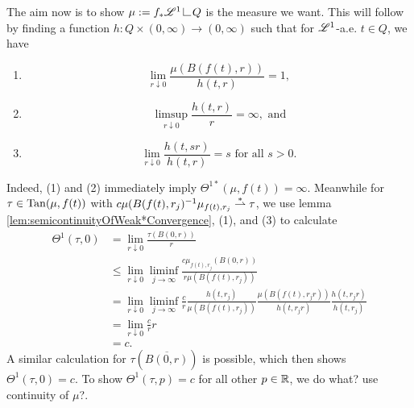 The aim now is to show $\mu := f_* \scrL^1 \restrict Q$ is the measure we want. This will follow by finding a function $h \colon Q \times (0,\infty) \to (0,\infty)$ such that for $\mathscr{L}^1$-a.e. $t \in Q$, we have
\begin{enumerate}[label=(\arabic*)] 
    \item \begin{equation} \label{eq:asymptoticEquiv}
        \lim_{r \downarrow 0} \frac{\mu(B(f(t),r))}{h(t,r)} = 1,
    \end{equation}

    \item \begin{equation} \label{eq:singular}
        \limsup_{r \downarrow 0} \frac{h(t,r)}{r} = \infty, \text{ and}
    \end{equation}

    \item \begin{equation} \label{eq:uniformity}
        \lim_{r \downarrow 0} \frac{h(t,sr)}{h(t,r)} = s \text{ for all } s > 0.
    \end{equation}
\end{enumerate}
Indeed, (1) and (2) immediately imply $\Theta^{1*}(\mu,f(t)) = \infty$. Meanwhile for $\tau \in \operatorname{Tan}(\mu,f(t))$ with $c\mu(B(f(t),r_j)^{-1} \mu_{f(t),r_j} \overset{\ast}{\rightharpoonup} \tau$, we use lemma \ref{lem:semicontinuityOfWeak*Convergence}, (1), and (3) to calculate
\begin{equation} \begin{aligned}
    \Theta^1(\tau,0) &= \lim_{r \downarrow 0} \frac{\tau(B(0,r))}{r} \\
                     &\leq \lim_{r \downarrow 0} \liminf_{j \to \infty} \frac{c \mu_{f(t),r_j}(B(0,r))}{r\mu(B(f(t),r_j))} \\
                     &= \lim_{r \downarrow 0} \liminf_{j \to \infty} \frac{c}{r} \frac{ h(t,r_j) }{ \mu(B(f(t),r_j)) } \frac{ \mu(B(f(t),r_j r)) }{ h(t,r_j r) } \frac{ h(t,r_jr) }{ h(t,r_j) } \\
                     &= \lim_{r \downarrow 0} \frac{c}{r} r \\
                     &= c.
\end{aligned} \end{equation}
A similar calculation for $\tau(\overline{B(0,r)})$ is possible, which then shows $\Theta^1(\tau,0) = c$. To show $\Theta^1(\tau,p) = c$ for all other $p \in \mathbb{R}$, we {\color{red} do what? use continuity of $\mu$?}.

